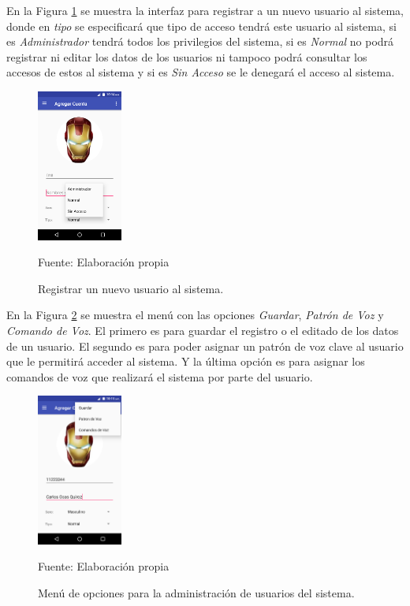 En la Figura \ref{fig:figura3.41} se muestra la interfaz para registrar a un nuevo usuario al sistema, donde en \textit{tipo} se especificará que tipo de acceso tendrá este usuario al sistema, si es \textit{Administrador} tendrá todos los privilegios del sistema, si es \textit{Normal} no podrá registrar ni editar los datos de los usuarios ni tampoco podrá consultar los accesos de estos al sistema y si es \textit{Sin Acceso} se le denegará el acceso al sistema.

\begin{figure}[H]
\captionsetup{justification=centering}
\begin{center}
\includegraphics[width=0.25\textwidth]{Imagenes/Cap3/image041}
\end{center}
\begin{center}
\vskip -0.5cm
\caption{\small{Registrar un nuevo usuario al sistema.}}
\label{fig:figura3.41}
{\small{Fuente: Elaboración propia}}
\end{center}
\end{figure}

En la Figura \ref{fig:figura3.42} se muestra el menú con las opciones \textit{Guardar}, \textit{Patrón de Voz} y \textit{Comando de Voz}. El primero es para guardar el registro o el editado de los datos de un usuario. El segundo es para poder asignar un patrón de voz clave al usuario que le permitirá acceder al sistema. Y la última opción es para asignar los comandos de voz que realizará el sistema por parte del usuario.
\begin{figure}[H]
\captionsetup{justification=centering}
\begin{center}
\includegraphics[width=0.25\textwidth]{Imagenes/Cap3/image042}
\end{center}
\begin{center}
\vskip -0.5cm
\caption{\small{Menú de opciones para la administración de usuarios del sistema.}}
\label{fig:figura3.42}
{\small{Fuente: Elaboración propia}}
\end{center}
\end{figure}

